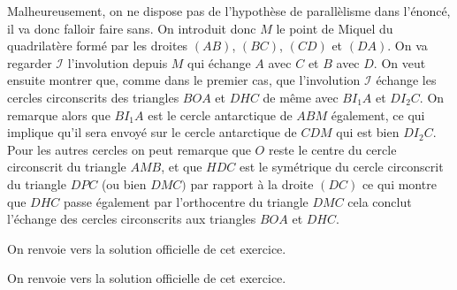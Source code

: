 \begin{sol}
Malheureusement, on ne dispose pas de l'hypothèse de parallèlisme dans l'énoncé, il va donc falloir faire sans. On introduit donc $M$ le point de Miquel du quadrilatère formé par les droites $(AB)$, $(BC)$, $(CD)$ et $(DA)$. On va regarder $\mathcal I$ l'involution depuis $M$ qui échange $A$ avec $C$ et $B$ avec $D$. On veut ensuite montrer que, comme dans le premier cas, que l'involution $\mathcal I$ échange les cercles circonscrits des triangles $BOA$ et $DHC$ de même avec $BI_1A$ et $DI_2C$. On remarque alors que $BI_1A$ est le cercle antarctique de $ABM$ également, ce qui implique qu'il sera envoyé sur le cercle antarctique de $CDM$ qui est bien $DI_2C$. Pour les autres cercles on peut remarque que $O$ reste le centre du cercle circonscrit du triangle $AMB$, et que $HDC$ est le symétrique du cercle circonscrit du triangle $DPC$ (ou bien $DMC)$ par rapport à la droite $(DC)$ ce qui montre que $DHC$ passe également par l'orthocentre du triangle $DMC$ cela conclut l'échange des cercles circonscrits aux triangles $BOA$ et $DHC$.
\end{sol}


\begin{sol}
On renvoie vers la solution officielle de cet exercice.
\end{sol}

\begin{sol}
On renvoie vers la solution officielle de cet exercice.
\end{sol}

